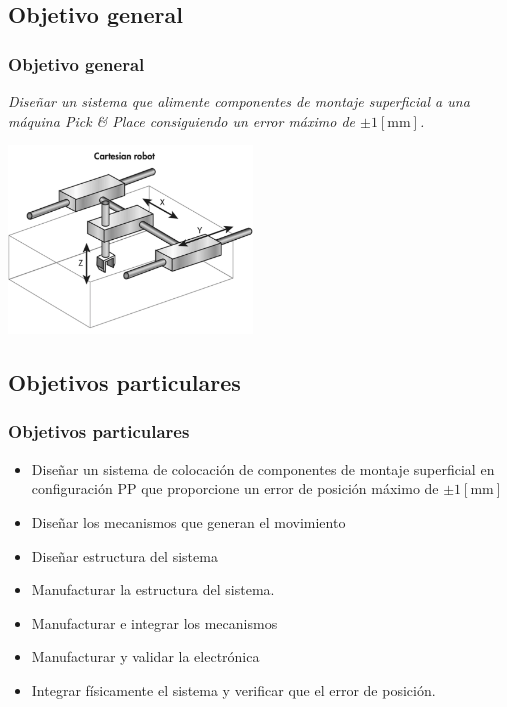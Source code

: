 	\begin{frame}
		\section{Objetivo general}
		\frametitle{Objetivo general}
		\begin{center}
			\textit{Diseñar un sistema que alimente componentes de montaje superficial a una máquina Pick \& Place consiguiendo un error máximo de $ \pm 1 [\si {\milli \meter}] $.} 
		\end{center}
	
		\begin{center}
			\includegraphics[height=50mm]{images/PP}
		\end{center}
	\end{frame}
	\begin{frame}
		\section{Objetivos particulares}
		\frametitle{Objetivos particulares}
		\begin{itemize}
			\item Diseñar un sistema de colocación de componentes de montaje superficial en configuración PP que proporcione un error de posición máximo de $ \pm 1 [\si {\milli \meter}] $
			\item Diseñar los mecanismos que generan el movimiento
			\item Diseñar estructura del sistema
			\item Manufacturar la estructura del sistema.
			\item Manufacturar e integrar los mecanismos
			\item Manufacturar y validar la electrónica
			\item Integrar físicamente el sistema y verificar que el error de posición.
		\end{itemize}
	\end{frame}
